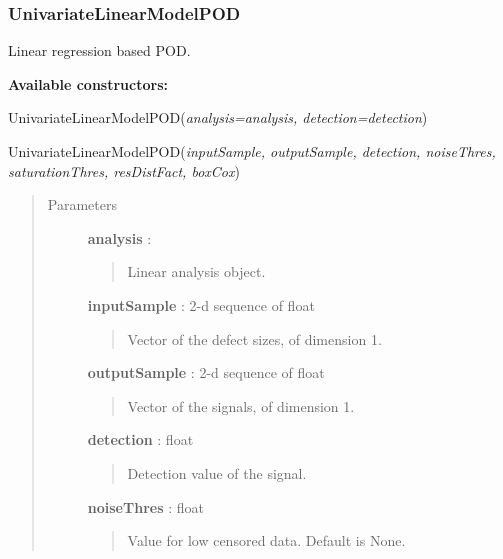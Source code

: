 \documentclass[letterpaper,10pt,english]{sphinxmanual}
\begin{document}
\subsubsection{UnivariateLinearModelPOD}
\label{_generated/otpod.UnivariateLinearModelPOD:univariatelinearmodelpod}\label{_generated/otpod.UnivariateLinearModelPOD::doc}

\begin{fulllineitems}
\label{_generated/otpod.UnivariateLinearModelPOD:otpod.UnivariateLinearModelPOD}
Linear regression based POD.

\textbf{Available constructors:}

UnivariateLinearModelPOD(\emph{analysis=analysis, detection=detection})

UnivariateLinearModelPOD(\emph{inputSample, outputSample, detection, noiseThres,
saturationThres, resDistFact, boxCox})
\begin{quote}\begin{description}
\item[{Parameters}] \leavevmode
\textbf{analysis} : {\hyperref[_generated/otpod.UnivariateLinearModelAnalysis:otpod.UnivariateLinearModelAnalysis]{\emph{}}}
\begin{quote}

Linear analysis object.
\end{quote}

\textbf{inputSample} : 2-d sequence of float
\begin{quote}

Vector of the defect sizes, of dimension 1.
\end{quote}

\textbf{outputSample} : 2-d sequence of float
\begin{quote}

Vector of the signals, of dimension 1.
\end{quote}

\textbf{detection} : float
\begin{quote}

Detection value of the signal.
\end{quote}

\textbf{noiseThres} : float
\begin{quote}

Value for low censored data. Default is None.
\end{quote}


\end{description}
\end{quote}
\end{fulllineitems}
\end{document}
